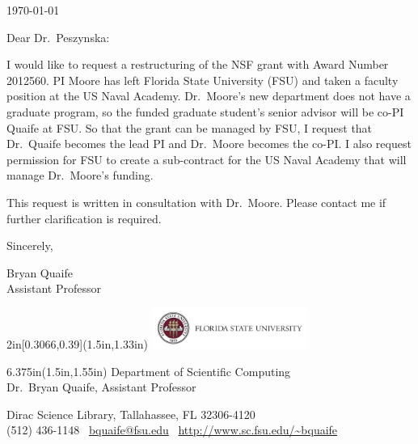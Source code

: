 \documentclass{article}
\begin{document}
\today
\bigskip

Dear Dr.~Peszynska:

I would like to request a restructuring of the NSF grant with Award
Number 2012560. PI Moore has left Florida State University (FSU) and
taken a faculty position at the US Naval Academy. Dr.~Moore's new
department does not have a graduate program, so the funded graduate
student's senior advisor will be co-PI Quaife at FSU. So that the grant
can be managed by FSU, I request that Dr.~Quaife becomes the lead PI and
Dr.~Moore becomes the co-PI. I also request permission for FSU to create
a sub-contract for the US Naval Academy that will manage Dr.~Moore's
funding.

This request is written in consultation with Dr.~Moore. Please contact
me if further clarification is required.

Sincerely,
\vspace{2\baselineskip}

Bryan Quaife \\
Assistant Professor


\begin{textblock*}{2in}[0.3066,0.39](1.5in,1.33in)
\includegraphics[width=2in]{fsu_logo}
\end{textblock*}
\begin{textblock*}{6.375in}(1.5in,1.55in)
\sffamily
\hfill \color{fsugarnet} Department of Scientific Computing \\
\hfill Dr.~Bryan Quaife,
Assistant Professor
\end{textblock*}

\vfill
{\footnotesize\color{fsugarnet} Dirac Science Library, Tallahassee, FL
32306-4120 \\
[-0.1\baselineskip]
(512) 436-1148 \textbullet\
\url{bquaife@fsu.edu}
\textbullet\
\url{http://www.sc.fsu.edu/~bquaife}
}
\end{document}
